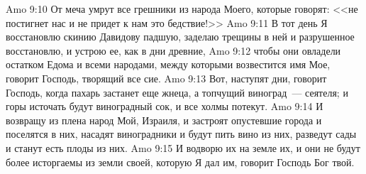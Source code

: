 \vs Amo 9:10 От меча умрут все грешники из народа Моего, которые говорят: <<не постигнет нас и не придет к нам это бедствие!>>
\vs Amo 9:11 В тот день Я восстановлю скинию Давидову падшую, заделаю трещины в ней и разрушенное восстановлю, и устрою ее, как в дни древние,
\vs Amo 9:12 чтобы они овладели остатком Едома и всеми народами, между которыми возвестится имя Мое, говорит Господь, творящий все сие.
\vs Amo 9:13 Вот, наступят дни, говорит Господь, когда пахарь застанет еще жнеца, а топчущий виноград~--- сеятеля; и горы источать будут виноградный сок, и все холмы потекут.
\vs Amo 9:14 И возвращу из плена народ Мой, Израиля, и застроят опустевшие города и поселятся в них, насадят виноградники и будут пить вино из них, разведут сады и станут есть плоды из них.
\vs Amo 9:15 И водворю их на земле их, и они не будут более исторгаемы из земли своей, которую Я дал им, говорит Господь Бог твой.
